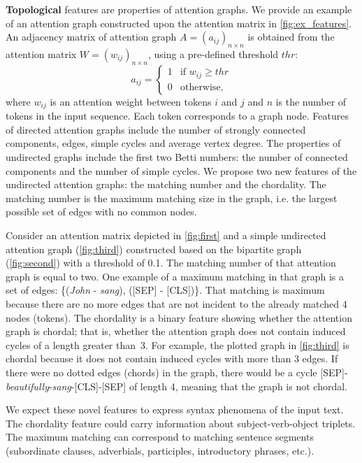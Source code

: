 \documentclass[11pt]{article}
\begin{document}
\textbf{Topological} features are properties of attention graphs.
We provide an example of an attention graph constructed upon the attention matrix in \autoref{fig:ex_features}.
An adjacency matrix of attention graph $A=(a_{ij})_{n\times n}$ is obtained from the attention matrix $W=(w_{ij})_{n\times n}$, using a pre-defined threshold $thr$: 
\begin{equation*}
a_{ij} = 
 \begin{cases}
   1 &\text{if $w_{ij}\geq thr$}\\
   0 &\text{otherwise,}
 \end{cases}
\end{equation*}
where $w_{ij}$ is an attention weight between tokens $i$ and $j$ and $n$ is the number of tokens in the input sequence. Each token corresponds to a graph node.
Features of directed attention graphs include the number of strongly connected components, edges, simple cycles and average vertex degree. 
The properties of undirected graphs include the first two Betti numbers: the number of connected components and the number of simple cycles. 
We propose two new features of the undirected attention graphs: the matching number and the chordality. 
The matching number is the maximum matching size in the graph, i.e. the largest possible set of edges with no common nodes.

Consider an attention matrix depicted in \autoref{fig:first} and a simple undirected attention graph (\autoref{fig:third}) constructed based on the bipartite graph (\autoref{fig:second}) with a threshold of 0.1.
The matching number of that attention graph is equal to two.
One example of a maximum matching in that graph is a set of edges: \{(\textit{John} - \textit{sang}), (\textsc{[SEP]} - \textsc{[CLS]})\}. 
That matching is maximum because there are no more edges that are not incident to the already matched 4 nodes (tokens).
The chordality is a binary feature showing whether the attention graph is chordal; that is, whether the attention graph does not contain induced cycles of a length greater than~3.
For example, the plotted graph in \autoref{fig:third} is chordal because it does not contain induced cycles with more than 3 edges. 
If there were no dotted edges (chords) in the graph, there would be a cycle \textsc{[SEP]}-\textit{beautifully}-\textit{sang}-\textsc{[CLS]}-\textsc{[SEP]} of length 4, meaning that the graph is not chordal. 

We expect these novel features to express syntax phenomena of the input text. 
The chordality feature could carry information about subject-verb-object triplets. The maximum matching can correspond to matching sentence segments (subordinate clauses, adverbials, participles, introductory phrases, etc.). 
\end{document}
